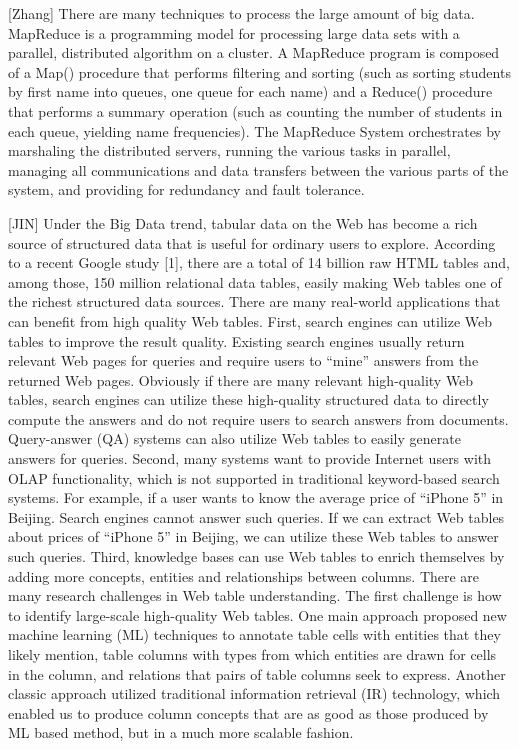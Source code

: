 \documentclass{article} %
\begin{document}
[Zhang] There are many techniques to process the large amount of big data. MapReduce is a programming model for processing large data sets with a parallel, distributed algorithm on a cluster. A MapReduce program is composed of a Map() procedure that performs filtering and sorting (such as sorting students by first name into queues, one queue for each name) and a Reduce() procedure that performs a summary operation (such as counting the number of students in each queue, yielding name frequencies). The MapReduce System orchestrates by marshaling the distributed servers, running the various tasks in parallel, managing all communications and data transfers between the various parts of the system, and providing for redundancy and fault tolerance.

[JIN] Under the Big Data trend, tabular data on the Web has become a rich source of structured data that is useful for ordinary users to explore.  According to a recent Google study [1], there are a total of 14 billion raw HTML tables and, among those, 150 million relational data tables, easily making Web tables one of the richest structured data sources. There are many real-world applications that can benefit from high quality Web tables. First, search engines can utilize Web tables to improve the result quality. Existing search engines usually return relevant Web pages for queries and require users to “mine” answers from the returned Web pages. Obviously if there are many relevant high-quality Web tables, search engines can utilize these high-quality structured data to directly compute the answers and do not require users to search answers from documents. Query-answer (QA) systems can also utilize Web tables to easily generate answers for queries. Second, many systems want to provide Internet users with OLAP functionality, which is not supported in traditional keyword-based search systems. For example, if a user wants to know the average price of “iPhone 5” in Beijing. Search engines cannot answer such queries. If we can extract Web tables about prices of “iPhone 5” in Beijing, we can utilize these Web tables to answer such queries. Third, knowledge bases can use Web tables to enrich themselves by adding more concepts, entities and relationships between columns.
There are many research challenges in Web table understanding. The first challenge is how to identify large-scale high-quality Web tables. One main approach proposed new machine learning (ML) techniques to annotate table cells with entities that they likely mention, table columns with types from which entities are drawn for cells in the column, and relations that pairs of table columns seek to express. Another classic approach utilized traditional information retrieval (IR) technology, which enabled us to produce column concepts that are as good as those produced by ML based method, but in a much more scalable fashion.
\end{document}
